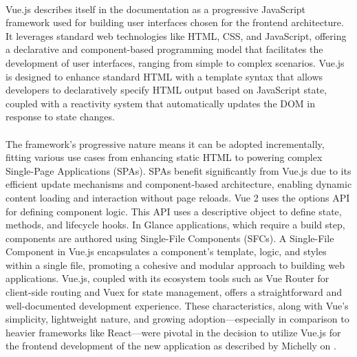 \paragraph{} Vue.js describes itself in the documentation \cite{VuejsDocumentation} as a progressive JavaScript framework used for building user interfaces chosen for the frontend architecture. It leverages standard web technologies like HTML, CSS, and JavaScript, offering a declarative and component-based programming model that facilitates the development of user interfaces, ranging from simple to complex scenarios. Vue.js is designed to enhance standard HTML with a template syntax that allows developers to declaratively specify HTML output based on JavaScript state, coupled with a reactivity system that automatically updates the DOM in response to state changes.

\paragraph{} The framework's progressive nature means it can be adopted incrementally, fitting various use cases from enhancing static HTML to powering complex Single-Page Applications (SPAs). SPAs benefit significantly from Vue.js due to its efficient update mechanisms and component-based architecture, enabling dynamic content loading and interaction without page reloads. Vue 2 uses the options API for defining component logic. This API uses a descriptive object to define state, methods, and lifecycle hooks. In Glance applications, which require a build step, components are authored using Single-File Components (SFCs). A Single-File Component in Vue.js encapsulates a component's template, logic, and styles within a single file, promoting a cohesive and modular approach to building web applications. Vue.js, coupled with its ecosystem tools such as Vue Router for client-side routing and Vuex for state management, offers a straightforward and well-documented development experience. These characteristics, along with Vue's simplicity, lightweight nature, and growing adoption—especially in comparison to heavier frameworks like React—were pivotal in the decision to utilize Vue.js for the frontend development of the new application as described by Michelly on \cite{michelly}.  

